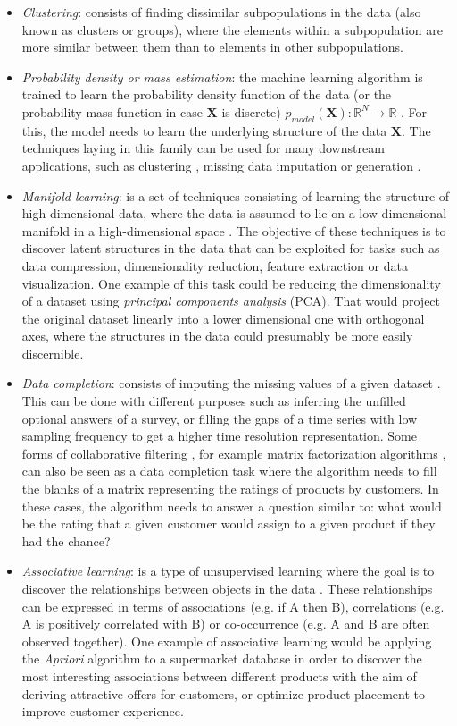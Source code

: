 \begin{itemize}
	\item \textit{Clustering}: consists of finding dissimilar subpopulations in the data (also known as clusters or groups), where the elements within a subpopulation are more similar between them than to elements in other subpopulations.
	\item \textit{Probability density or mass estimation}: the machine learning algorithm is trained to learn the probability density function of the data (or the probability mass function in case $\mathbf{X}$ is discrete) $p_{model}(\textbf{X}): \mathbb{R}^N \rightarrow \mathbb{R}$ \autocite{Goodfellow2016}. For this, the model needs to learn the underlying structure of the data $\mathbf{X}$. The techniques laying in this family can be used for many downstream applications, such as clustering \autocite{wang2006}, missing data imputation \autocite{qichuan2015} or generation \autocite{liu2020a}.
	\item \textit{Manifold learning}: is a set of techniques consisting of learning the structure of high-dimensional data, where the data is assumed to lie on a low-dimensional manifold in a high-dimensional space \autocite{murphy2012}. The objective of these techniques is to discover latent structures in the data that can be exploited for tasks such as data compression, dimensionality reduction, feature extraction or data visualization. One example of this task could be reducing the dimensionality of a dataset using \textit{principal components analysis} (PCA). That would project the original dataset linearly into a lower dimensional one with orthogonal axes, where the structures in the data could presumably be more easily discernible.
	\item \textit{Data completion}: consists of imputing the missing values of a given dataset \autocite{vanburen_2018}. This can be done with different purposes such as inferring the unfilled optional answers of a survey, or filling the gaps of a time series with low sampling frequency to get a higher time resolution representation. Some forms of collaborative filtering \autocite{falk2019}, for example matrix factorization algorithms \autocite{koren2009}, can also be seen as a data completion task where the algorithm needs to fill the blanks of a matrix representing the ratings of products by customers. In these cases, the algorithm needs to answer a question similar to: what would be the rating that a given customer would assign to a given product if they had the chance?
	\item \textit{Associative learning}:  is a type of unsupervised learning where the goal is to discover the relationships between objects in the data \autocite{zhang2002}. These relationships can be expressed in terms of associations (e.g. if A then B), correlations (e.g. A is positively correlated with B) or co-occurrence (e.g. A and B are often observed together). One example of associative learning would be applying the \textit{Apriori} algorithm \autocite{agrawal1996} to a supermarket database in order to discover the most interesting associations between different products with the aim of deriving attractive offers for customers, or optimize product placement to improve customer experience. 

\end{itemize}
